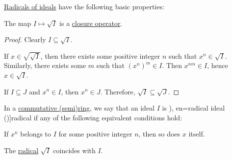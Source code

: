 \begin{proposition}\label{thm:def:radical_of_ideal}
  \hyperref[def:radical_of_ideal]{Radicals of ideals} have the following basic properties:
  \begin{thmenum}
     The map \( I \mapsto \sqrt I \) is a \hyperref[def:abstract_closure_operator]{closure operator}.
  \end{thmenum}
\end{proposition}
\begin{proof}
   Clearly \( I \subseteq \sqrt I \).

   If \( x \in \sqrt {\sqrt I} \), then there exists some positive integer \( n \) such that \( x^n \in \sqrt I \). Similarly, there exists some \( m \) such that \( (x^n)^m \in I \). Then \( x^{nm} \in I \), hence \( x \in \sqrt I \).

   If \( I \subseteq J \) and \( x^n \in I \), then \( x^n \in J \). Therefore, \( \sqrt I \subseteq \sqrt J \).
\end{proof}

\begin{definition}\label{def:radical_ideal}
  In a \hyperref[def:ring/commutative]{commutative (semi)ring}, we say that an ideal \( I \) is \term[ru=радикал (\cite[406]{Винберг2014КурсАлгебры}), en=radical ideal (\cite[def. VII.2.13]{Aluffi2009Algebra})]{radical} if any of the following equivalent conditions hold:
  \begin{thmenum}
    \mimprovised If \( x^n \) belongs to \( I \) for some positive integer \( n \), then so does \( x \) itself.

     The \hyperref[def:radical_of_ideal]{radical} \( \sqrt I \) coincides with \( I \).
  \end{thmenum}
\end{definition}

